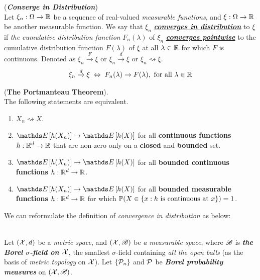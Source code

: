 \documentclass[11pt]{article}
\begin{document}
\begin{itemize}
\begin{example}
\begin{definition}  (\emph{\textbf{Converge in Distribution}}) \citep{van2000asymptotic}\\
Let $\xi_n : \Omega \rightarrow {\mathbb R}$ be a sequence of real-valued \emph{measurable functions}, and $\xi: \Omega \rightarrow {\mathbb R}$ be another measurable function. We say that $\xi_n$ \underline{\emph{\textbf{converges in distribution}}} to $\xi$ if \emph{the cumulative distribution function} $F_n(\lambda)$ of $\xi_n$
\underline{\emph{\textbf{converges pointwise}}} to the cumulative distribution function $F(\lambda)$ of $\xi$ at all $\lambda \in  {\mathbb R}$ for which $F$ is continuous. Denoted as $\xi_{n}\stackrel{F}{\rightarrow} \xi$ or \underline{$\xi_{n}\stackrel{d}{\rightarrow} \xi$} or \underline{$\xi_n \rightsquigarrow \xi$}. 
\begin{align*}
\xi_{n}\stackrel{d}{\rightarrow} \xi \; \Leftrightarrow \; F_n(\lambda) \rightarrow F(\lambda), \text{ for all }\lambda \in {\mathbb R}
\end{align*}
\end{definition}

\begin{theorem} (\textbf{The Portmanteau Theorem}).  \citep{van2000asymptotic}\\
 The following statements are equivalent.
 \begin{enumerate}
 \item $X_n \rightsquigarrow X$.
 \item $\E{}{h(X_n)} \rightarrow \E{}{h(X)}$ for all \textbf{continuous functions} $h: {\mathbb R}^d \rightarrow {\mathbb R}$ that are non-zero only on a \textbf{closed} and \textbf{bounded} set.
 \item $\E{}{h(X_n)} \rightarrow \E{}{h(X)}$ for all \textbf{bounded continuous functions} $h: {\mathbb R}^d \rightarrow {\mathbb R}$.
 \item $\E{}{h(X_n)} \rightarrow \E{}{h(X)}$ for all \textbf{bounded measurable functions} $h: {\mathbb R}^d \rightarrow {\mathbb R}$ for which ${\mathbb P}(X \in \{x: h\text{ is continuous at }x\})=1$.
 \end{enumerate}
\end{theorem}

We can reformulate the definition of \emph{convergence in distribution} as below:
\begin{definition} \citep{wellner2013weak}\\
Let $({\mathcal X}, d)$ be a \emph{metric space}, and $({\mathcal X}, {\mathscr B})$ be \emph{a measurable space}, where ${\mathscr B}$ is \emph{\textbf{the Borel $\sigma$-field on ${\mathcal X}$}}, the smallest $\sigma$-field containing \emph{all the open balls} (as the basis of \emph{metric topology} on ${\mathcal X}$). Let $\{{\mathcal P}_n \}$ and ${\mathcal P}$ be \emph{\textbf{Borel probability measures}} on $({\mathcal X}, {\mathscr B})$.


\end{definition}
\end{example}
\end{itemize}
\end{document}
